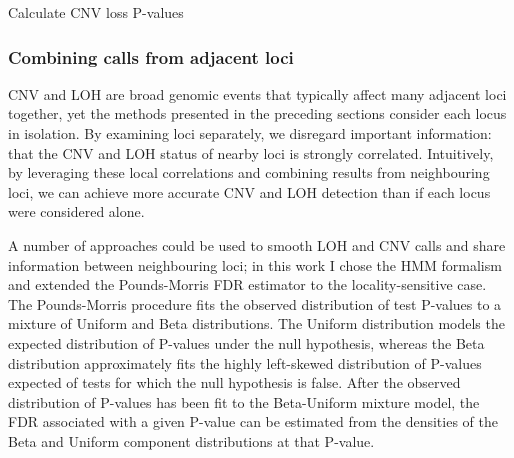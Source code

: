\documentclass[thesis.tex]{subfiles}
\begin{document}
\begin{algorithm}

  \label{alg:comp_find_cnv}
  \caption{Calculate \acrshort{CNV} loss P-values}
\end{algorithm}

\subsubsection{Combining calls from adjacent loci}

\Gls{CNV} and \gls{LOH} are broad genomic events that typically affect many adjacent loci together, yet the methods presented in the preceding sections consider each locus in isolation.  By examining loci separately, we disregard important information: that the \gls{CNV} and \gls{LOH} status of nearby loci is strongly correlated.  Intuitively, by leveraging these local correlations and combining results from neighbouring loci, we can achieve more accurate \gls{CNV} and \gls{LOH} detection than if each locus were considered alone.

A number of approaches could be used to smooth LOH and CNV calls and share information between neighbouring loci; in this work I chose the \gls{HMM} formalism and extended the Pounds-Morris FDR estimator\cite{Pounds2003} to the locality-sensitive case.  The Pounds-Morris procedure fits the observed distribution of test P-values to a mixture of Uniform and Beta distributions.  The Uniform distribution models the expected distribution of P-values under the null hypothesis, whereas the Beta distribution approximately fits the highly left-skewed distribution of P-values expected of tests for which the null hypothesis is false.  After the observed distribution of P-values has been fit to the Beta-Uniform mixture model, the \gls{FDR} associated with a given P-value can be estimated from the densities of the Beta and Uniform component distributions at that P-value.
\end{document}
